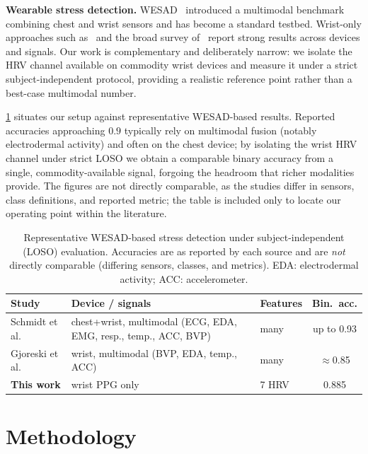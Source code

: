 \documentclass[conference]{IEEEtran}
\begin{document}
\textbf{Wearable stress detection.} WESAD~\cite{schmidt2018wesad} introduced a
multimodal benchmark combining chest and wrist sensors and has become a standard
testbed. Wrist-only approaches such as~\cite{gjoreski2017stress} and the broad
survey of~\cite{can2019stress} report strong results across devices and signals.
Our work is complementary and deliberately narrow: we isolate the HRV channel
available on commodity wrist devices and measure it under a strict
subject-independent protocol, providing a realistic reference point rather than a
best-case multimodal number.

\cref{tab:related} situates our setup against representative WESAD-based results.
Reported accuracies approaching $0.9$ typically rely on multimodal fusion (notably
electrodermal activity) and often on the chest device; by isolating the wrist HRV
channel under strict LOSO we obtain a comparable binary accuracy from a single,
commodity-available signal, forgoing the headroom that richer modalities provide.
The figures are not directly comparable, as the studies differ in sensors, class
definitions, and reported metric; the table is included only to locate our operating
point within the literature.

\begin{table}[t]
  \centering
  \caption{Representative WESAD-based stress detection under subject-independent
  (LOSO) evaluation. Accuracies are as reported by each source and are \emph{not}
  directly comparable (differing sensors, classes, and metrics). EDA: electrodermal
  activity; ACC: accelerometer.}
  \label{tab:related}
  \begin{tabular}{@{}p{2.3cm}p{2.2cm}p{1.4cm}c@{}}
    \toprule
    Study & Device / signals & Features & Bin.\ acc. \\
    \midrule
    Schmidt et al.~\cite{schmidt2018wesad} & chest+wrist, multimodal (ECG, EDA, EMG, resp., temp., ACC, BVP) & many & up to 0.93 \\
    Gjoreski et al.~\cite{gjoreski2017stress} & wrist, multimodal (BVP, EDA, temp., ACC) & many & $\approx$0.85 \\
    \textbf{This work} & wrist PPG only & 7 HRV & 0.885 \\
    \bottomrule
  \end{tabular}
\end{table}

\section{Methodology}
\label{sec:method}
\end{document}
